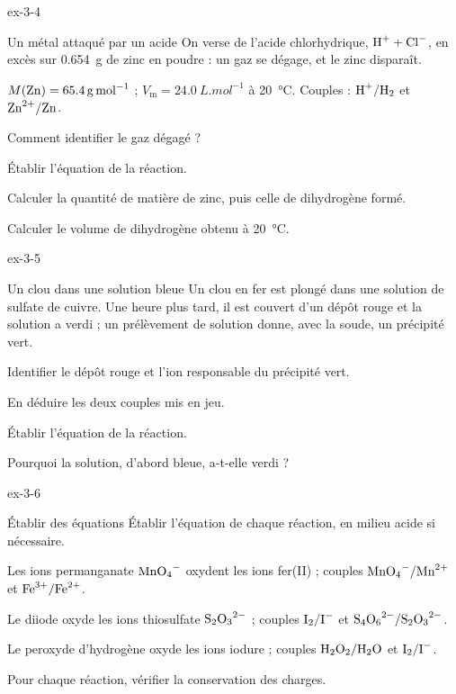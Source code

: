 \begin{blocLivre}{ex-3-4}
\begin{exercice}[1]{Un métal attaqué par un acide}
On verse de l'acide chlorhydrique, $\ce{H+}+\ce{Cl-}$, en excès sur \qty{0,654}{g} de zinc en poudre : un gaz se dégage, et le zinc
disparaît.
\begin{donnees}
$M(\ce{Zn})=\qty{65,4}{g.mol^{-1}}$ ; $V_\mathrm{m}=\qty{24,0}{L.mol^{-1}}$ à \qty{20}{\degreeCelsius}. Couples : $\ce{H+}/\ce{H2}$ et $\ce{Zn^{2+}}/\ce{Zn}$.
\end{donnees}
\begin{questions}
\item Comment identifier le gaz dégagé ?
\item Établir l'équation de la réaction.
\item Calculer la quantité de matière de zinc, puis celle de dihydrogène formé.
\item Calculer le volume de dihydrogène obtenu à \qty{20}{\degreeCelsius}.
\end{questions}
\end{exercice}
\end{blocLivre}
\begin{blocLivre}{ex-3-5}
\begin{exercice}[1]{Un clou dans une solution bleue}
Un clou en fer est plongé dans une solution de sulfate de cuivre. Une heure plus tard, il est couvert d'un dépôt rouge et
la solution a verdi ; un prélèvement de solution donne, avec la soude, un précipité vert.
\begin{questions}
\item Identifier le dépôt rouge et l'ion responsable du précipité vert.
\item En déduire les deux couples mis en jeu.
\item Établir l'équation de la réaction.
\item Pourquoi la solution, d'abord bleue, a-t-elle verdi ?
\end{questions}
\end{exercice}
\end{blocLivre}
\begin{blocLivre}{ex-3-6}
\begin{exercice}[2]{Établir des équations}
Établir l'équation de chaque réaction, en milieu acide si nécessaire.
\begin{questions}
\item Les ions permanganate $\ce{MnO4-}$ oxydent les ions fer(II) ; couples $\ce{MnO4-}/\ce{Mn^{2+}}$ et $\ce{Fe^{3+}}/\ce{Fe^{2+}}$.
\item Le diiode oxyde les ions thiosulfate $\ce{S2O3^{2-}}$ ; couples $\ce{I2}/\ce{I-}$ et $\ce{S4O6^{2-}}/\ce{S2O3^{2-}}$.
\item Le peroxyde d'hydrogène oxyde les ions iodure ; couples $\ce{H2O2}/\ce{H2O}$ et $\ce{I2}/\ce{I-}$.
\item Pour chaque réaction, vérifier la conservation des charges.
\end{questions}
\end{exercice}
\end{blocLivre}
